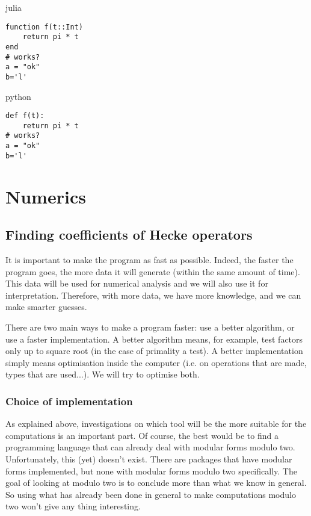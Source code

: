 %
julia

\begin{verbatim}
function f(t::Int)
	return pi * t
end
# works?
a = "ok"
b='l'
\end{verbatim}

python

\begin{verbatim}
def f(t):
	return pi * t
# works?
a = "ok"
b='l'

\end{verbatim}



\section{Numerics}
\subsection{Finding coefficients of Hecke operators}
It is important to make the program as fast as possible.
Indeed, the faster the program goes, the more data it will generate (within the same amount of time).
This data will be used for numerical analysis and we will also use it for interpretation.
Therefore, with more data, we have more knowledge, and we can make smarter guesses.

There are two main ways to make a program faster:
use a better algorithm, or 
use a faster implementation.
A better algorithm means, for example, test factors only up to square root (in the case of primality a test).
A better implementation simply means optimisation inside the computer (i.e. on operations that are made, types that are used...).
We will try to optimise both.

\subsubsection{Choice of implementation}
As explained above, investigations on which tool will be the more suitable for the computations is an important part.
Of course, the best would be to find a programming language that can already deal with modular forms modulo two.
Unfortunately, this (yet) doesn't exist.
There are packages that have modular forms implemented, but none with modular forms modulo two specifically.
The goal of looking at modulo two is to conclude more than what we know in general.
So using what has already been done in general to make computations modulo two won't give any thing interesting.

